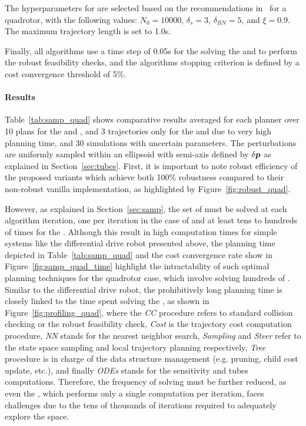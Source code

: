 The hyperparameters for  are selected based on the recommendations in~\cite{cSST} for a quadrotor, with the following values: $N_0 = 10000$, $\delta_s = 3$, $\delta_{BN} = 5$, and $\xi = 0.9$.
The maximum trajectory length is set to 1.0s.

Finally, all algorithms use a time step of 0.05s for the solving the  and to perform the robust feasibility checks, and the algorithms stopping criterion is defined by a cost convergence threshold of 5\%.

\paragraph{Results}



Table~\ref{tab:samp_quad} shows comparative results averaged for each planner over 10 plans for the  and , and 3 trajectories only for the  and  due to very high planning time, and 30 simulations with uncertain parameters. 
The perturbations are uniformly sampled within an ellipsoid with semi-axis defined by $\delta \boldsymbol{p}$ as explained in Section~\ref{sec:tubes}.
First, it is important to note robust efficiency of the proposed  variants which achieve both 100\% robustness compared to their non-robust vanilla implementation, as highlighted by Figure~\ref{fig:robust_quad}.

However, as explained in Section~\ref{sec:samp}, the set of  must be solved at each algorithm iteration, one per iteration in the case of  and at least tens to hundreds of times for the .
Although this result in high computation times for simple systems like the differential drive robot presented above, the planning time depicted in Table~\ref{tab:samp_quad} and the cost convergence rate show in Figure~\ref{fig:samp_quad_time} highlight the intractability of such optimal planning techniques for the quadrotor case, which involve solving hundreds of .
Similar to the differential drive robot, the prohibitively long planning time is closely linked to the time spent solving the , as shown in Figure~\ref{fig:profiling_quad}, where the \emph{CC} procedure refers to standard collision checking or the robust feasibility check, \emph{Cost} is the trajectory cost computation procedure, \emph{NN} stands for the nearest neighbor search, \emph{Sampling} and \emph{Steer} refer to the state space sampling and local trajectory planning respectively, \emph{Tree} procedure is in charge of the data structure management (e.g. pruning, child cost update, etc.), and finally \emph{ODEs} stands for the sensitivity and tubes computations.
Therefore, the frequency of  solving must be further reduced, as even the , which performs only a single computation per iteration, faces challenges due to the tens of thousands of iterations required to adequately explore the space.

